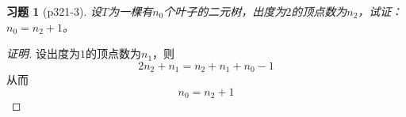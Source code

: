 \documentclass{article}
\begin{document}
\begin{CJK}{UTF8}{gbsn}
  \newtheorem*{Exercise}{习题}
\begin{Exercise}[p321-3]
  设$T$为一棵有$n_0$个叶子的二元树，出度为$2$的顶点数为$n_2$，试证：$n_0=n_2+1$。
\end{Exercise}
\begin{proof}[证明]
  设出度为$1$的顶点数为$n_1$，则\[2n_2+n_1=n_2+n_1+n_0-1\]
  从而\[n_0=n_2+1\]
\end{proof}
\end{CJK}
\end{document}
